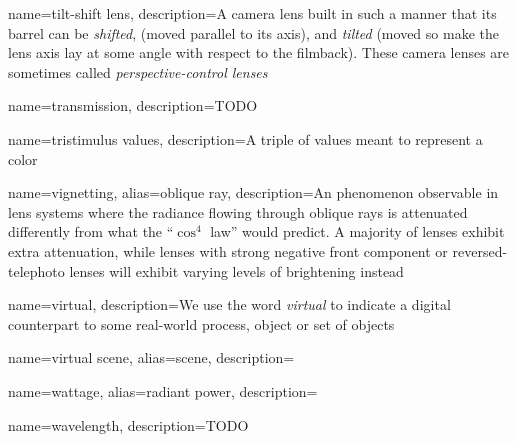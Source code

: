 {
	name={tilt-shift lens},
	description={A camera lens built in such a manner that its barrel can be \emph{shifted},
		(moved parallel to its axis), and \emph{tilted} (moved so make the lens axis 
		lay at some angle with respect to the filmback). These camera lenses are sometimes called
		\emph{perspective-control lenses}}
}

{
	name={transmission},
	description={TODO}
}

{
	name={tristimulus values},
	description={A triple of values meant to represent a color}
}
	
{
	name={vignetting},
	alias={oblique ray},
	description={An phenomenon observable in lens systems where the radiance flowing through
		oblique rays is attenuated differently from what the ``$\cos^4$ law'' would predict.
		A majority of lenses exhibit extra attenuation, while lenses with strong negative front 
		component or reversed-telephoto lenses will exhibit varying levels of brightening instead
	}
}

{    
	name={virtual},
	description={We use the word \textsl{virtual} to indicate a digital counterpart to some
		real-world process, object or set of objects}
}

{
	name={virtual scene},
	alias={scene},
	description=\nopostdesc
}

{    
	name={wattage},
	alias={radiant power},
	description=\nopostdesc
}

{    
	name={wavelength},
	description={TODO}
}
